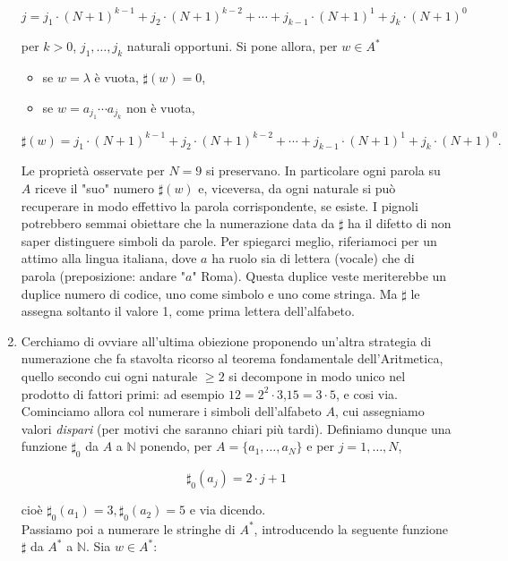 \begin{enumerate}
          $$
              j=j_1 \cdot(N+1)^{k-1}+j_2 \cdot(N+1)^{k-2}+\cdots+j_{k-1} \cdot(N+1)^1+j_k \cdot(N+1)^0
          $$

          per $k>0$, $j_1, \ldots, j_k$ naturali opportuni. Si pone allora, per
          $w \in A^*$

          \begin{itemize}
              \item se $w=\lambda$ è vuota, $\sharp(w)=0$,
              \item se $w=a_{j_1} \cdots a_{j_k}$ non è vuota,
          \end{itemize}

          $$
              \sharp(w)=j_1 \cdot(N+1)^{k-1}+j_2 \cdot(N+1)^{k-2}+\cdots+j_{k-1} \cdot(N+1)^1+j_k \cdot(N+1)^0 .
          $$

          Le proprietà osservate per $N=9$ si preservano. In particolare ogni
          parola su $A$ riceve il "suo" numero $\sharp(w)$ e, viceversa, da ogni
          naturale si può recuperare in modo effettivo la parola corrispondente,
          se esiste.
          I pignoli potrebbero semmai obiettare che la numerazione data da
          $\sharp$ ha il difetto di non saper distinguere simboli da parole.
          Per spiegarci meglio, riferiamoci per un attimo alla lingua italiana, dove
          $a$ ha ruolo sia di lettera (vocale) che di parola (preposizione: andare
          "$a$" Roma). Questa duplice veste meriterebbe un duplice numero di codice,
          uno come simbolo e uno come stringa. Ma $\sharp$ le assegna soltanto il valore 1,
          come prima lettera dell'alfabeto.

    \item Cerchiamo di ovviare all'ultima obiezione proponendo un'altra strategia
          di numerazione che fa stavolta ricorso al teorema fondamentale
          dell'Aritmetica, quello secondo cui ogni naturale $\geq 2$ si decompone
          in modo unico nel prodotto di fattori primi: ad esempio
          $12=2^2 \cdot 3$,$15=3 \cdot 5$, e cosi via. Cominciamo allora col
          numerare i simboli dell'alfabeto $A$, cui assegniamo
          valori \textit{dispari} (per motivi che saranno chiari più tardi).
          Definiamo dunque una funzione $\sharp_0$ da $A$ a $\mathbb{N}$ ponendo,
          per $A=\{a_1, \ldots, a_N\}$ e per $j=1, \ldots, N$,

          $$
              \sharp_0\left(a_j\right)=2 \cdot j+1
          $$

          cioè $\sharp_0(a_1)=3, \sharp_0(a_2)=5$ e via dicendo.\\
          Passiamo poi a numerare le stringhe di $A^*$, introducendo la seguente
          funzione $\sharp$ da $A^*$ a $\mathbb{N}$. Sia $w \in A^*$:


\end{enumerate}
